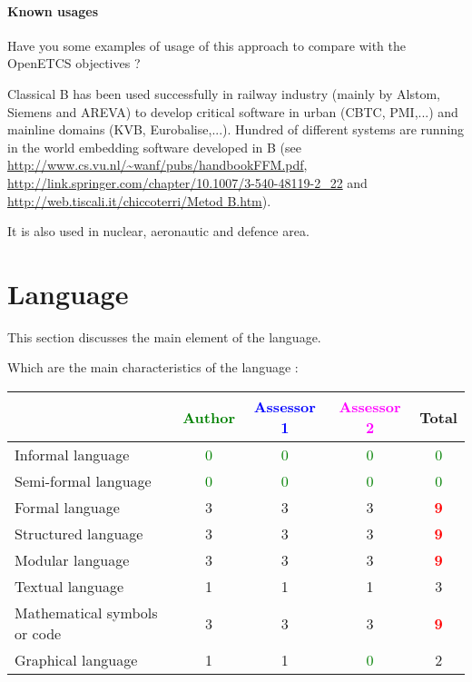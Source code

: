 \paragraph{Known usages} Have you some examples of usage of this approach to  compare with the OpenETCS objectives ?

\begin{author_comment}

Classical B has been used successfully  in railway  industry (mainly by Alstom, Siemens and AREVA) to  develop critical software in urban (CBTC, PMI,...) and mainline domains (KVB, Eurobalise,...). Hundred of different systems are running in the world embedding software developed in B (see \url{http://www.cs.vu.nl/~wanf/pubs/handbookFFM.pdf}, \url{http://link.springer.com/chapter/10.1007/3-540-48119-2_22} and \url{http://web.tiscali.it/chiccoterri/Metod B.htm}).

It is also used in nuclear, aeronautic and defence area.

\end{author_comment}


\section{Language}
This section discusses the main element of the language.

Which are the main characteristics of the language :

\begin{tabular}{|l | c | c | c | c|}
\hline
& \textcolor{green}{Author} & \textcolor{blue}{Assessor 1} & \textcolor{magenta}{Assessor 2} & Total \\
\hline 
Informal language & \textcolor{green}{0} & \textcolor{green}{0} & \textcolor{green}{0} & \textcolor{green}{0} \\
\hline 
Semi-formal language & \textcolor{green}{0} & \textcolor{green}{0} & \textcolor{green}{0} & \textcolor{green}{0} \\
\hline
Formal language & 3     & 3     & 3     & \textcolor{red}{\textbf{9}} \\
\hline
Structured language & 3     & 3     & 3     & \textcolor{red}{\textbf{9}} \\
\hline
Modular language & 3     & 3     & 3     & \textcolor{red}{\textbf{9}} \\
\hline
Textual language & 1     & 1     & 1     & 3     \\
\hline
Mathematical symbols or code & 3     & 3     & 3     & \textcolor{red}{\textbf{9}} \\
\hline
Graphical language & 1     & 1     & \textcolor{green}{0} & 2     \\
\hline
\end{tabular}

